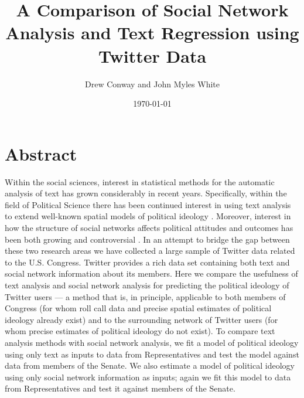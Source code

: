 \documentclass[10pt]{article}
\title{A Comparison of Social Network Analysis and Text Regression using Twitter Data}
\author{Drew Conway and John Myles White}
\date{\today}
\begin{document}
\maketitle

\section{Abstract}
Within the social sciences, interest in statistical methods for the automatic analysis of text has grown considerably in recent years.  Specifically, within the field of Political Science there has been continued interest in using text analysis to extend well-known spatial models of political ideology \citep{Grimmer_2011, Monroe_2008, Laver_2003}.  Moreover, interest in how the structure of social networks affects political attitudes and outcomes has been both growing \citep{Siegel_2009, Burton_2009} and controversial \citep{Fowler_2010, Lyons_2010}.  In an attempt to bridge the gap between these two research areas we have collected a large sample of Twitter data related to the U.S. Congress. Twitter provides a rich data set containing both text and social network information about its members. Here we compare the usefulness of text analysis and social network analysis for predicting the political ideology of Twitter users --- a method that is, in principle, applicable to both members of Congress (for whom roll call data and precise spatial estimates of political ideology already exist) and to the surrounding network of Twitter users (for whom precise estimates of political ideology do not exist). To compare text analysis methods with social network analysis, we fit a model of political ideology using only text as inputs to data from Representatives and test the model against data from members of the Senate. We also estimate a model of political ideology using only social network information as inputs; again we fit this model to data from Representatives and test it against members of the Senate. 

\end{document}
